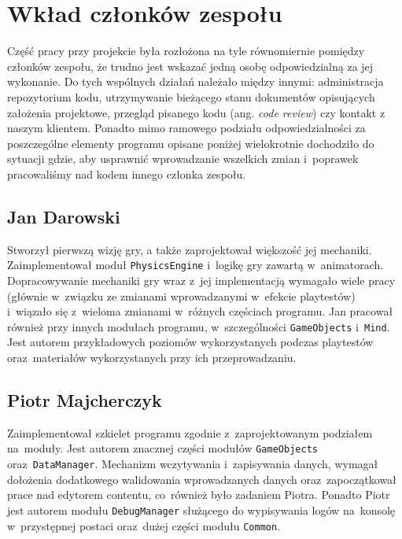 \documentclass[licencjacka]{pracamgr}
\begin{document}
\chapter{Wkład członków zespołu}
    Część pracy przy projekcie była rozłożona na tyle równomiernie pomiędzy członków zespołu, że trudno jest wskazać
    jedną osobę odpowiedzialną za jej wykonanie. Do tych wspólnych działań należało między innymi: administracja
    repozytorium kodu, utrzymywanie bieżącego stanu dokumentów opisujących założenia projektowe, przegląd pisanego kodu
    (ang. \emph{code review}) czy kontakt z naszym klientem. Ponadto mimo ramowego podziału odpowiedzialności za
    poszczególne elementy programu opisane poniżej wielokrotnie dochodziło do sytuacji gdzie, aby usprawnić
    wprowadzanie wszelkich zmian i~poprawek pracowaliśmy nad kodem innego członka zespołu.
  
  \section{Jan Darowski}
    Stworzył pierwszą wizję gry, a także zaprojektował większość jej mechaniki. Zaimplementował moduł
    \texttt{PhysicsEngine} i~logikę gry zawartą w~animatorach. Dopracowywanie mechaniki gry wraz z~jej implementacją
    wymagało wiele pracy (głównie w~związku ze zmianami wprowadzanymi w~efekcie playtestów) i~wiązało się z~wieloma
    zmianami w~różnych częściach programu. Jan pracował również przy innych modułach programu, w~szczególności
    \texttt{GameObjects} i~\texttt{Mind}. Jest autorem przykładowych poziomów wykorzystanych podczas playtestów
    oraz~materiałów wykorzystanych przy ich przeprowadzaniu.

  \section{Piotr Majcherczyk}
    Zaimplementował szkielet programu zgodnie z~zaprojektowanym podziałem na~moduły. Jest autorem znacznej części modułów
    \texttt{GameObjects} oraz~\texttt{DataManager}. Mechanizm wczytywania i~zapisywania danych, wymagał dołożenia
    dodatkowego walidowania wprowadzanych danych oraz~zapoczątkował prace nad edytorem contentu, co~również było zadaniem
    Piotra. Ponadto Piotr jest autorem modułu \texttt{DebugManager} służącego do wypisywania logów na~konsolę w~przystępnej
    postaci oraz~dużej części modułu \texttt{Common}.
\end{document}
